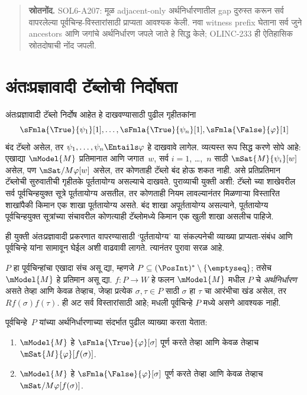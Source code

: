 \begin{quote}\small\textbf{स्रोतनोंद.} SOL6-A207: मूळ adjacent-only अर्थनिर्धारणातील gap दुरुस्त करून सर्व वापरलेल्या पूर्वचिन्ह-विस्तारांसाठी प्राप्यता आवश्यक केली. नवा witness prefix घेताना सर्व जुने ancestors आणि जगांचे अर्थनिर्धारण जपले जाते हे सिद्ध केले; OLINC-233 ही ऐतिहासिक स्रोतदोषाची नोंद जपली.\end{quote}






\section{अंतःप्रज्ञावादी टॅब्लोची निर्दोषता}\label{int:tab:sou:sec}

\begin{explain}
  अंतःप्रज्ञावादी टॅब्लो निर्दोष आहेत हे
  दाखवण्यासाठी पुढील गृहीतकांना
  \[
  \sFmla{\True}{\psi_1}[1], \dots, \sFmla{\True}{\psi_n}[1], \sFmla{\False}{\varphi}[1]
  \]
  बंद टॅब्लो असेल, तर $\psi_1, \dots, \psi_n \Entails \varphi$
  हे दाखवावे लागेल. व्यत्यस्त रूप सिद्ध करणे सोपे आहे:
  एखाद्या $\mModel{M}$ प्रतिमानात आणि जगात~$w$,
  सर्व $i=1$, \dots,~$n$ साठी
  $\mSat{M}{\psi_i}[w]$ असेल, पण
  $\mSat/{M}{\varphi}[w]$ असेल, तर कोणताही
  टॅब्लो बंद होऊ शकत नाही. असे
  प्रतिप्रतिमान टॅब्लोची सुरुवातीची
  गृहीतके पूर्ततायोग्य असल्याचे दाखवते.
  पुराव्याची युक्ती अशी: टॅब्लो
  च्या शाखेवरील सर्व पूर्वचिन्हयुक्त
  सूत्रे पूर्ततायोग्य असतील, तर
  कोणताही नियम लावल्यानंतर मिळणाऱ्या
  विस्तारित शाखांपैकी किमान एक शाखा
  पूर्ततायोग्य असते. बंद शाखा अपूर्ततायोग्य
  असल्याने, पूर्ततायोग्य पूर्वचिन्हयुक्त
  सूत्रांच्या संचावरील कोणत्याही
  टॅब्लोमध्ये किमान एक खुली शाखा
  असलीच पाहिजे.

  ही युक्ती अंतःप्रज्ञावादी प्रकरणात
  वापरण्यासाठी ‘पूर्ततायोग्य’ या संकल्पनेची
  व्याख्या प्राप्यता-संबंध आणि पूर्वचिन्हे
  यांना सामावून घेईल अशी वाढवावी लागते.
  त्यानंतर पुरावा सरळ आहे.
\end{explain}

\begin{defn}
  $P$ हा पूर्वचिन्हांचा एखादा संच असू द्या,
  म्हणजे $P \subseteq (\PosInt)^*
  \setminus \{\emptyseq\}$; तसेच
  $\mModel{M}$ हे प्रतिमान असू द्या.
  $f\colon P\to W$ हे फलन $\mModel{M}$ मधील
  $P$ चे \emph{अर्थनिर्धारण} असते तेव्हा आणि केवळ तेव्हाच,
  जेव्हा प्रत्येक $\sigma,\tau\in P$ साठी $\sigma$ हा
  $\tau$ चा आरंभीचा खंड असेल, तर $Rf(\sigma)f(\tau)$.
  ही अट सर्व विस्तारांसाठी आहे; मधली पूर्वचिन्हे
  $P$ मध्ये असणे आवश्यक नाही.

  पूर्वचिन्हे~$P$ यांच्या अर्थनिर्धारणाच्या
  संदर्भात पुढील व्याख्या करता येतात:
  \begin{enumerate}
  \item $\mModel{M}$ हे $\sFmla{\True}{\varphi}[\sigma]$
    पूर्ण करते तेव्हा आणि केवळ तेव्हाच
    $\mSat{M}{\varphi}[f(\sigma)]$.
  \item $\mModel{M}$ हे $\sFmla{\False}{\varphi}[\sigma]$
    पूर्ण करते तेव्हा आणि केवळ तेव्हाच
    $\mSat/{M}{\varphi}[f(\sigma)]$.
  \end{enumerate}
\end{defn}

